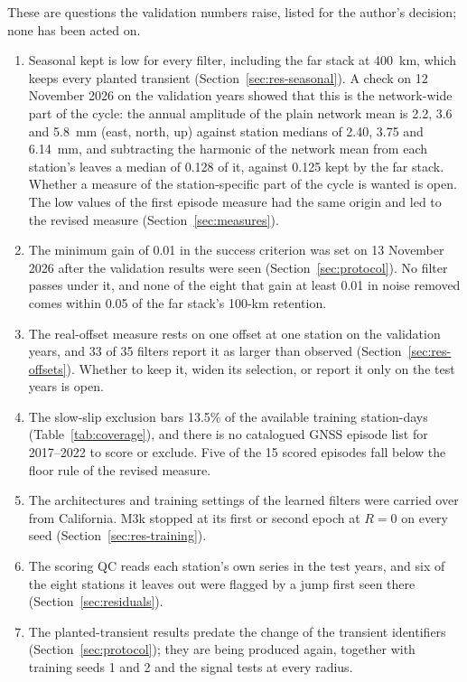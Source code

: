 \documentclass[preprint,12pt,authoryear]{elsarticle}
\begin{document}
These are questions the validation numbers raise, listed for the author's decision; none has been acted on.

\begin{enumerate}
  \item Seasonal kept is low for every filter, including the far stack at 400~km, which keeps every planted transient (Section~\ref{sec:res-seasonal}). A check on 12 November 2026 on the validation years showed that this is the network-wide part of the cycle: the annual amplitude of the plain network mean is 2.2, 3.6 and 5.8~mm (east, north, up) against station medians of 2.40, 3.75 and 6.14~mm, and subtracting the harmonic of the network mean from each station's leaves a median of 0.128 of it, against 0.125 kept by the far stack. Whether a measure of the station-specific part of the cycle is wanted is open. The low values of the first episode measure had the same origin and led to the revised measure (Section~\ref{sec:measures}).
  \item The minimum gain of 0.01 in the success criterion was set on 13 November 2026 after the validation results were seen (Section~\ref{sec:protocol}). No filter passes under it, and none of the eight that gain at least 0.01 in noise removed comes within 0.05 of the far stack's 100-km retention.
  \item The real-offset measure rests on one offset at one station on the validation years, and 33 of 35 filters report it as larger than observed (Section~\ref{sec:res-offsets}). Whether to keep it, widen its selection, or report it only on the test years is open.
  \item The slow-slip exclusion bars 13.5\% of the available training station-days (Table~\ref{tab:coverage}), and there is no catalogued GNSS episode list for 2017--2022 to score or exclude. Five of the 15 scored episodes fall below the floor rule of the revised measure.
  \item The architectures and training settings of the learned filters were carried over from California. M3k stopped at its first or second epoch at $R = 0$ on every seed (Section~\ref{sec:res-training}).
  \item The scoring QC reads each station's own series in the test years, and six of the eight stations it leaves out were flagged by a jump first seen there (Section~\ref{sec:residuals}).
  \item The planted-transient results predate the change of the transient identifiers (Section~\ref{sec:protocol}); they are being produced again, together with training seeds 1 and 2 and the signal tests at every radius.
\end{enumerate}
\end{document}
